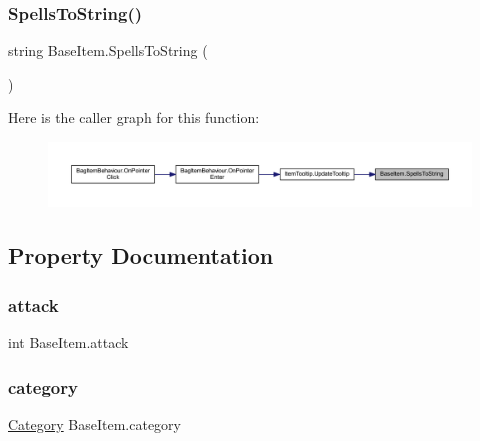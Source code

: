 \mbox{\label{class_base_item_a7b49af5c45c493b9ea7319de44c6c138}} 
\subsubsection{\texorpdfstring{SpellsToString()}{SpellsToString()}}
{\footnotesize\ttfamily string Base\+Item.\+Spells\+To\+String (\begin{DoxyParamCaption}{ }\end{DoxyParamCaption})}

Here is the caller graph for this function\+:\nopagebreak
\begin{figure}[H]
\begin{center}
\leavevmode
\includegraphics[width=350pt]{class_base_item_a7b49af5c45c493b9ea7319de44c6c138_icgraph}
\end{center}
\end{figure}


\subsection{Property Documentation}
\mbox{\label{class_base_item_a2b98fdf99b6c7ef2ae183c377245b133}} 
\subsubsection{\texorpdfstring{attack}{attack}}
{\footnotesize\ttfamily int Base\+Item.\+attack\hspace{0.3cm}{\ttfamily [get]}}

\mbox{\label{class_base_item_a219878018445243d4fc30538548b7425}} 
\subsubsection{\texorpdfstring{category}{category}}
{\footnotesize\ttfamily \mbox{\hyperlink{class_base_item_a882a2962396f880c2e23755437245d37}{Category}} Base\+Item.\+category\hspace{0.3cm}{\ttfamily [get]}}

